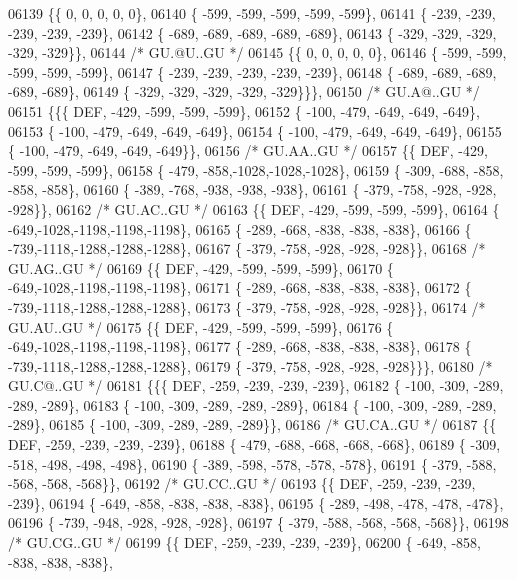 \begin{DoxyCode}
06139 \{\{    0,    0,    0,    0,    0\},
06140 \{ -599, -599, -599, -599, -599\},
06141 \{ -239, -239, -239, -239, -239\},
06142 \{ -689, -689, -689, -689, -689\},
06143 \{ -329, -329, -329, -329, -329\}\},
06144 \textcolor{comment}{/* GU.@U..GU */}
06145 \{\{    0,    0,    0,    0,    0\},
06146 \{ -599, -599, -599, -599, -599\},
06147 \{ -239, -239, -239, -239, -239\},
06148 \{ -689, -689, -689, -689, -689\},
06149 \{ -329, -329, -329, -329, -329\}\}\},
06150 \textcolor{comment}{/* GU.A@..GU */}
06151 \{\{\{  DEF, -429, -599, -599, -599\},
06152 \{ -100, -479, -649, -649, -649\},
06153 \{ -100, -479, -649, -649, -649\},
06154 \{ -100, -479, -649, -649, -649\},
06155 \{ -100, -479, -649, -649, -649\}\},
06156 \textcolor{comment}{/* GU.AA..GU */}
06157 \{\{  DEF, -429, -599, -599, -599\},
06158 \{ -479, -858,-1028,-1028,-1028\},
06159 \{ -309, -688, -858, -858, -858\},
06160 \{ -389, -768, -938, -938, -938\},
06161 \{ -379, -758, -928, -928, -928\}\},
06162 \textcolor{comment}{/* GU.AC..GU */}
06163 \{\{  DEF, -429, -599, -599, -599\},
06164 \{ -649,-1028,-1198,-1198,-1198\},
06165 \{ -289, -668, -838, -838, -838\},
06166 \{ -739,-1118,-1288,-1288,-1288\},
06167 \{ -379, -758, -928, -928, -928\}\},
06168 \textcolor{comment}{/* GU.AG..GU */}
06169 \{\{  DEF, -429, -599, -599, -599\},
06170 \{ -649,-1028,-1198,-1198,-1198\},
06171 \{ -289, -668, -838, -838, -838\},
06172 \{ -739,-1118,-1288,-1288,-1288\},
06173 \{ -379, -758, -928, -928, -928\}\},
06174 \textcolor{comment}{/* GU.AU..GU */}
06175 \{\{  DEF, -429, -599, -599, -599\},
06176 \{ -649,-1028,-1198,-1198,-1198\},
06177 \{ -289, -668, -838, -838, -838\},
06178 \{ -739,-1118,-1288,-1288,-1288\},
06179 \{ -379, -758, -928, -928, -928\}\}\},
06180 \textcolor{comment}{/* GU.C@..GU */}
06181 \{\{\{  DEF, -259, -239, -239, -239\},
06182 \{ -100, -309, -289, -289, -289\},
06183 \{ -100, -309, -289, -289, -289\},
06184 \{ -100, -309, -289, -289, -289\},
06185 \{ -100, -309, -289, -289, -289\}\},
06186 \textcolor{comment}{/* GU.CA..GU */}
06187 \{\{  DEF, -259, -239, -239, -239\},
06188 \{ -479, -688, -668, -668, -668\},
06189 \{ -309, -518, -498, -498, -498\},
06190 \{ -389, -598, -578, -578, -578\},
06191 \{ -379, -588, -568, -568, -568\}\},
06192 \textcolor{comment}{/* GU.CC..GU */}
06193 \{\{  DEF, -259, -239, -239, -239\},
06194 \{ -649, -858, -838, -838, -838\},
06195 \{ -289, -498, -478, -478, -478\},
06196 \{ -739, -948, -928, -928, -928\},
06197 \{ -379, -588, -568, -568, -568\}\},
06198 \textcolor{comment}{/* GU.CG..GU */}
06199 \{\{  DEF, -259, -239, -239, -239\},
06200 \{ -649, -858, -838, -838, -838\},

\end{DoxyCode}
